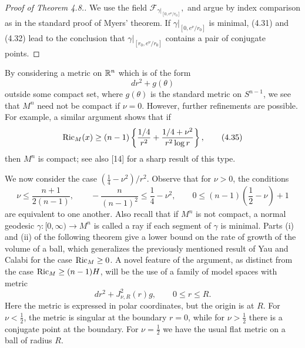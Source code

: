 \begin{proof}[Proof of Theorem 4.8.]
We use the field $\mathcal{F}_{\gamma|_{[0,e^{\nu}/r_0]}},$ and argue by index
comparison as in the standard proof of Myers' theorem. If
$\gamma|_{[0,e^{\nu}/r_0]}$ is minimal, (4.31) and (4.32) lead to the conclusion
that $\gamma|_{[r_0,e^{\nu}/r_0]}$ contains a pair of conjugate points.
\end{proof}

\begin{remark}
\label{rem:borderline-asymptotic-ricci-compactness}
By considering a metric on $\mathbb{R}^n$ which is of the form
\begin{equation}
dr^2 + g(\theta)
\tag{4.34}
\end{equation}
outside some compact set, where $g(\theta)$ is the standard metric on $S^{n-1}$,
we see that $M^n$ need not be compact if $\nu = 0$. However, further refinements
are possible. For example, a similar argument shows that if
\begin{equation}
\operatorname{Ric}_M(x) \ge (n-1)\left\{\frac{1/4}{r^2} + \frac{1/4 + \nu^2}{r^2\log r}\right\},
\tag{4.35}
\end{equation}
then $M^n$ is compact; see also [14] for a sharp result of this type.
\end{remark}

We now consider the case $(\frac14-\nu^2)/r^2$. Observe that for $\nu>0$, the
conditions
\begin{equation}
\nu \le \frac{n+1}{2(n-1)}, \qquad
-\frac{n}{(n-1)^2} \le \frac14-\nu^2, \qquad
0 \le (n-1)\left(\frac12-\nu\right)+1
\tag{4.36}
\end{equation}
are equivalent to one another. Also recall that if $M^n$ is not compact, a
normal geodesic $\gamma:[0,\infty)\to M^n$ is called a ray if each segment of
$\gamma$ is minimal. Parts (i) and (ii) of the following theorem give a lower
bound on the rate of growth of the volume of a ball, which generalizes the
previously mentioned result of Yau and Calabi for the case $\operatorname{Ric}_M\ge 0$.
A novel feature of the argument, as distinct from the case
$\operatorname{Ric}_M\ge (n-1)H$, will be the use of a family of model spaces with metric
\[
dr^2 + J^2_{\nu,R}(r)g,\qquad 0\le r\le R.
\]
Here the metric is expressed in polar coordinates, but the origin is at $R$.
For $\nu<\frac12$, the metric is singular at the boundary $r=0$, while for
$\nu>\frac12$ there is a conjugate point at the boundary. For $\nu=\frac12$
we have the usual flat metric on a ball of radius $R$.

